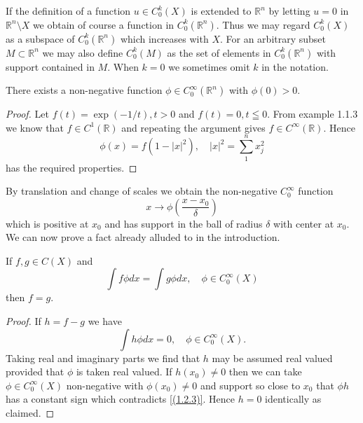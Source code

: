 If the definition of a function $u \in C_{0}^{k}(X)$ is extended to $\mathbb{R}^{n}$ by letting $u=0$ in $\mathbb{R}^{n} \setminus X$ we obtain of course a function in $C_{0}^{k}\left(\mathbb{R}^{n}\right)$. Thus we may regard $C_{0}^{k}(X)$ as a subspace of $C_{0}^{k}\left(\mathbb{R}^{n}\right)$ which increases with $X$. For an arbitrary subset $M \subset \mathbb{R}^{n}$ we may also define $C_{0}^{k}(M)$ as the set of elements in $C_{0}^{k}\left(\mathbb{R}^{n}\right)$ with support contained in $M$. When $k=0$ we sometimes omit $k$ in the notation.

\begin{lemma}
    There exists a non-negative function $\phi \in C_{0}^{\infty}\left(\mathbb{R}^{n}\right)$ with $\phi(0)>0$.
\end{lemma}
\begin{proof}
    Let $f(t)=\exp (-1 / t), t>0$ and $f(t)=0, t \leqq 0$. From example 1.1.3 we know that $f \in C^{1}(\mathbb{R})$ and repeating the argument gives $f \in C^{\infty}(\mathbb{R})$. Hence
\[
	\phi(x)=f\left(1-|x|^{2}\right), \quad|x|^{2}=\sum_{1}^{n} x_{j}^{2}
\]
has the required properties.
\end{proof}

By translation and change of scales we obtain the non-negative $C_{0}^{\infty}$ function
\begin{equation}
    \label{(1.2.1)}
	x \rightarrow \phi\left(\frac{x-x_{0}}{\delta}\right)
\end{equation}
which is positive at $x_{0}$ and has support in the ball of radius $\delta$ with center at $x_{0}$. We can now prove a fact already alluded to in the introduction.

\begin{theorem}
    If $f, g \in C(X)$ and
\begin{equation}
    \label{(1.2.2)}
        \int f \phi d x=\int g \phi d x, \quad \phi \in C_{0}^{\infty}(X)
\end{equation}
then $f=g$.
\end{theorem}
\begin{proof}
    If $h=f-g$ we have
    \begin{equation}
        \label{(1.2.3)}
        \int h \phi d x=0, \quad \phi \in C_{0}^{\infty}(X).
    \end{equation}
    Taking real and imaginary parts we find that $h$ may be assumed real valued provided that $\phi$ is taken real valued. If $h(x_0) \neq 0$ then we can take $\phi \in C_{0}^{\infty}(X)$ non-negative with $\phi(x_0) \neq 0$ and support so close to $x_{0}$ that $\phi h$ has a constant sign which contradicts \eqref{(1.2.3)}. Hence $h=0$ identically as claimed.
\end{proof}

